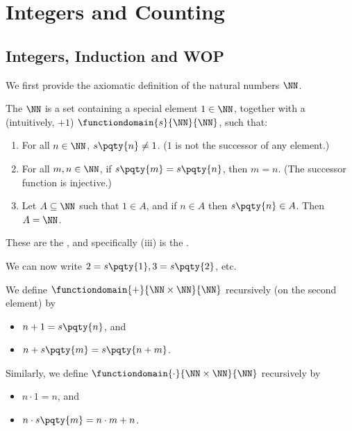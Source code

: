 \section{Integers and Counting}
\label{sec:integers-counting}

\subsection{Integers, Induction and WOP}
\label{sec:integers-induction-wop}

We first provide the axiomatic definition of the natural numbers \(\NN\).

\begin{definition}
    The  \(\NN\) is a set containing a special element \(1 \in \NN\), together with a  (intuitively, \(+ 1\)) \(\functiondomain{s}{\NN}{\NN}\), such that:
    \begin{enumerate}
        \item For all \(n \in \NN\), \(s \pqty{n} \neq 1\). (\(1\) is not the successor of any element.)
        \item For all \(m, n \in \NN\), if \(s\pqty{m} = s\pqty{n}\), then \(m = n\). (The successor function is injective.)
        \item Let \(A \subseteq \NN\) such that \(1 \in A\), and if \(n \in A\) then \(s\pqty{n} \in A\). Then \(A = \NN\).
    \end{enumerate}

    These are the , and specifically (iii) is the .
\end{definition}

We can now write \(2 = s\pqty{1}, 3 = s\pqty{2}\), etc.

\begin{definition}
    We define \(\functiondomain{+}{\NN \times \NN}{\NN}\) recursively (on the second element) by
    \begin{itemize}
        \item \(n + 1 = s\pqty{n}\), and
        \item \(n + s\pqty{m} = s\pqty{n + m}\).
    \end{itemize}

    Similarly, we define \(\functiondomain{\cdot}{\NN \times \NN}{\NN}\) recursively by
    \begin{itemize}
        \item \(n \cdot 1 = n\), and
        \item \(n \cdot s\pqty{m} = n \cdot m + n\).
    \end{itemize}
\end{definition}

